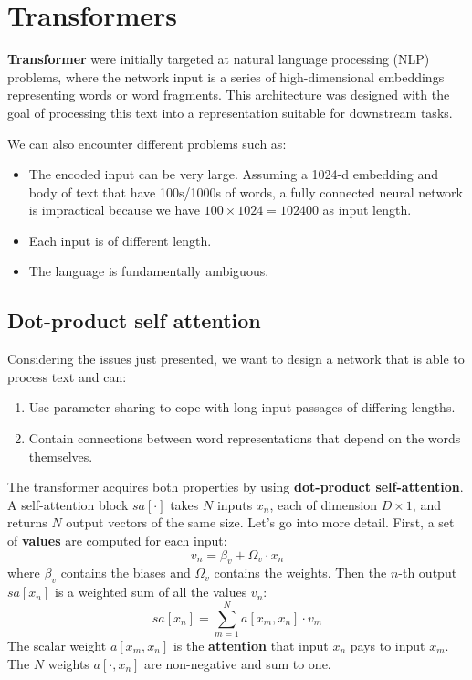 \chapter{Transformers}
\textbf{Transformer} were initially targeted at natural language processing (NLP) problems, where the 
network input is a series of high-dimensional embeddings representing words or word fragments. This
architecture was designed with the goal of processing this text into a representation suitable for
downstream tasks. 

We can also encounter different problems such as:
\begin{itemize}
    \item The encoded input can be very large. Assuming a 1024-d embedding and body of text that have 100s/1000s of
        words, a fully connected neural network is impractical because we have $100 \times 1024 = 102400$ as input
        length. 
    \item Each input is of different length.
    \item The language is fundamentally ambiguous.
\end{itemize}
\section{Dot-product self attention}
Considering the issues just presented, we want to design a network that is able to process text and can:
\begin{enumerate}
    \item Use parameter sharing to cope with long input passages of differing lengths.
    \item Contain connections between word representations that depend on the words themselves.
\end{enumerate}
The transformer acquires both properties by using \textbf{dot-product self-attention}. A self-attention block $sa[\cdot]$
takes $N$ inputs $x_n$, each of dimension $D \times 1$, and returns $N$ output vectors of the same size. Let's go into 
more detail. First, a set of \textbf{values} are computed for each input:
\begin{equation}
    v_n = \beta_v + \Omega_v \cdot x_n
\end{equation}
where $\beta_v$ contains the biases and $\Omega_v$ contains the weights. Then the $n$-th output $sa[x_n]$ is a weighted 
sum of all the values $v_n$:
\begin{equation}
    sa[x_n] = \sum_{m = 1}^N a[x_m, x_n] \cdot v_m
\end{equation}
The scalar weight $a[x_m, x_n]$ is the \textbf{attention} that input $x_n$ pays to input $x_m$. The $N$ weights $a[\cdot 
    , x_n]$ are non-negative and sum to one. 

